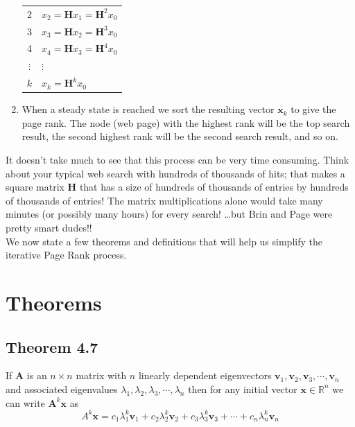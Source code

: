 \documentclass{article}
\begin{document}
\begin{enumerate}
\begin{table}[H]
\begin{tabular}{|c|>{\raggedright\arraybackslash}p{6cm}|}
                2 & $x_2 = \boldsymbol{H} x_1 = \boldsymbol{H}^2 x_0$ \\
                3 & $x_3 = \boldsymbol{H} x_2 = \boldsymbol{H}^3 x_0$ \\
                4 & $x_4 = \boldsymbol{H} x_3 = \boldsymbol{H}^4 x_0$ \\
                $\vdots$ & $\vdots$ \\
                $k$ & $x_k = \boldsymbol{H}^k x_0$ \\
                \hline
                \end{tabular}
            \end{table}
    \item When a steady state is reached we sort the resulting vector $\boldsymbol{x}_k$ to give the page rank. The node (web page) with the highest rank will be the top search result, the second highest rank will be the second search result, and so on.
            
\end{enumerate}

\noindent It doesn’t take much to see that this process can be very time consuming. Think about your typical web search with hundreds of thousands of hits; that makes a square matrix $\boldsymbol{H}$ 
that has a size of hundreds of thousands of entries by hundreds of thousands of entries! The matrix multiplications alone would take many minutes (or possibly many hours) for every search! …but Brin and Page were pretty smart dudes!!\\

\noindent We now state a few theorems and definitions that will help us simplify the iterative Page Rank process.


\section{Theorems}

\subsection*{Theorem 4.7}

If $\boldsymbol{A}$ is an $n\times n$ matrix with $n$ linearly dependent eigenvectors $\boldsymbol{v}_1,\boldsymbol{v}_2, \boldsymbol{v}_3,\cdots,\boldsymbol{v}_n$
and associated eigenvalues $\lambda_1,\lambda_2,\lambda_3,\cdots,\lambda_n$ then for any initial vector $\boldsymbol{x} \in \mathbb{R}^n$
we can write $\boldsymbol{A}^k\boldsymbol{x}$ as
$$
A^k\boldsymbol{x}=c_1\lambda_1^k\boldsymbol{v}_1+c_2\lambda_2^k\boldsymbol{v}_2+c_3\lambda_3^k\boldsymbol{v}_3+\cdots+c_n\lambda_n^k\boldsymbol{v}_n
$$
\end{document}
